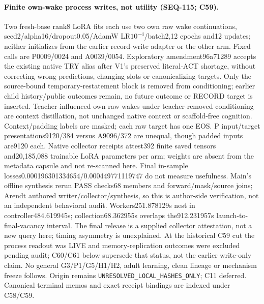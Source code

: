 \documentclass{article}
\begin{document}
\paragraph{Finite own-wake process writes, not utility (SEQ-115; C59).} Two fresh-base rank8 LoRA fits each use two own raw wake continuations, seed2/alpha16/dropout0.05/AdamW LR$10^{-4}$/batch2,12 epochs and12 updates; neither initializes from the earlier record-write adapter or the other arm. Fixed calls are P0009/0024 and A0039/0054. Exploratory amendment96a71289 accepts the existing native TRY alias after V1's preserved literal-ACT shortage, without correcting wrong predictions, changing slots or canonicalizing targets. Only the source-bound temporary-restatement block is removed from conditioning; earlier child history/public outcomes remain, no future outcome or RECORD target is inserted. Teacher-influenced own raw wakes under teacher-removed conditioning are context distillation, not unchanged native context or scaffold-free cognition. Context/padding labels are masked; each raw target has one EOS. P input/target presentations9120/384 versus A9096/372 are unequal, though padded inputs are9120 each. Native collector receipts attest392 finite saved tensors and20,185,088 trainable LoRA parameters per arm; weights are absent from the metadata capsule and not re-scanned here. Final in-sample losses0.000196301334654/0.000449771119747 do not measure usefulness. Main's offline synthesis rerun PASS checks68 members and forward/mask/source joins; Arendt authored writer/collector/synthesis, so this is author-side verification, not an independent behavioral audit. Workers251.878129s nest in controller484.619945s; collection68.362955s overlaps the912.231957s launch-to-final-vacancy interval. The final release is a supplied collector attestation, not a new query here; timing asymmetry is unexplained. At the historical C59 cut the process readout was LIVE and memory-replication outcomes were excluded pending audit; C60/C61 below supersede that status, not the earlier write-only claim. No general G3/P1/G5/H1/H2, adult learning, clean lineage or mechanism freeze follows. Origin remains \texttt{UNRESOLVED\_LOCAL\_HASHES\_ONLY}; C11 deferred. Canonical terminal memos and exact receipt bindings are indexed under C58/C59.
\end{document}
